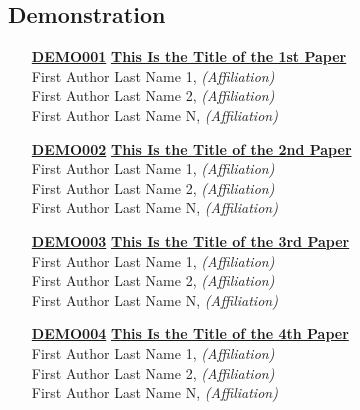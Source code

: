 \subsection{Demonstration}
\begin{enumerate}
\item[\href{https://doi.org/10.1145/1122445.1122456}{\textbf{DEMO001}}]
\href{https://doi.org/10.1145/1122445.1122456}{\textbf{This Is the Title of the 1st Paper}}\\
First Author Last Name 1, \emph{(Affiliation)}\\
First Author Last Name 2, \emph{(Affiliation)}\\
First Author Last Name N, \emph{(Affiliation)}\\

\item[\href{https://doi.org/10.1145/1122445.1122456}{\textbf{DEMO002}}]
\href{https://doi.org/10.1145/1122445.1122456}{\textbf{This Is the Title of the 2nd Paper}}\\
First Author Last Name 1, \emph{(Affiliation)}\\
First Author Last Name 2, \emph{(Affiliation)}\\
First Author Last Name N, \emph{(Affiliation)}\\

\item[\href{https://doi.org/10.1145/1122445.1122456}{\textbf{DEMO003}}]
\href{https://doi.org/10.1145/1122445.1122456}{\textbf{This Is the Title of the 3rd Paper}}\\
First Author Last Name 1, \emph{(Affiliation)}\\
First Author Last Name 2, \emph{(Affiliation)}\\
First Author Last Name N, \emph{(Affiliation)}\\

\item[\href{https://doi.org/10.1145/1122445.1122456}{\textbf{DEMO004}}]
\href{https://doi.org/10.1145/1122445.1122456}{\textbf{This Is the Title of the 4th Paper}}\\
First Author Last Name 1, \emph{(Affiliation)}\\
First Author Last Name 2, \emph{(Affiliation)}\\
First Author Last Name N, \emph{(Affiliation)}\\
\end{enumerate}


